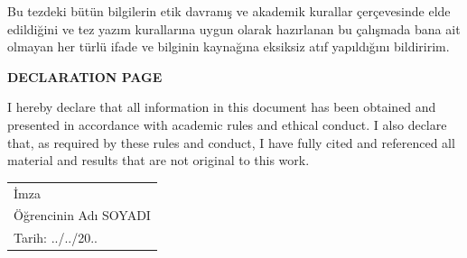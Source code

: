 \documentclass[12pt,oneside]{report}
\renewcommand{\thesisauthor}{Öğrencinin Adı SOYADI}    %
\begin{document}
	\begin{bildirim}
 
        \thispagestyle{empty}
		Bu tezdeki bütün bilgilerin etik davranış ve akademik kurallar çerçevesinde elde edildiğini ve tez yazım kurallarına uygun olarak hazırlanan bu çalışmada bana ait olmayan her türlü ifade ve bilginin kaynağına eksiksiz atıf yapıldığını bildiririm.
		
		\bigskip
		\bigskip
		
		\begin{center}
			\bfseries\MakeUppercase DECLARATION PAGE
		\end{center}
		
		I hereby declare that all information in this document has been obtained and presented in accordance with academic rules and ethical conduct. I also declare that, as required by these rules and conduct, I have fully cited and referenced all material and results that are not original to this work.
		\bigskip
		\vspace{0.5cm}
		
		\hfill
		\begin{tabular}{@{}l@{}}
			İmza %
			\\
			\thesisauthor\\ %
			Tarih: ../../20..
		\end{tabular}
		
	\end{bildirim}
	
	
\end{document}
